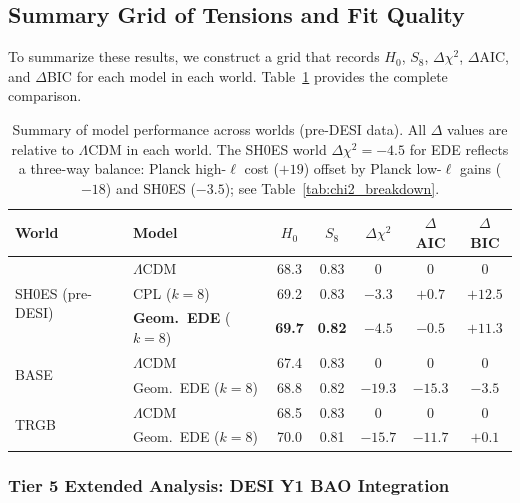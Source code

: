 \documentclass[a4paper,11pt]{article}
\begin{document}

\subsection{Summary Grid of Tensions and Fit Quality}
\label{sec:summary_grid}

To summarize these results, we construct a grid that records $H_0$, $S_8$, $\Delta\chi^2$, $\Delta$AIC, and $\Delta$BIC for each model in each world. Table~\ref{tab:summary_grid} provides the complete comparison.

\begin{table}[h]
\centering
\caption{Summary of model performance across worlds (pre-DESI data). All $\Delta$ values are relative to $\Lambda$CDM in each world. The SH0ES world $\Delta\chi^2 = -4.5$ for EDE reflects a three-way balance: Planck high-$\ell$ cost ($+19$) offset by Planck low-$\ell$ gains ($-18$) and SH0ES ($-3.5$); see Table~\ref{tab:chi2_breakdown}.}
\label{tab:summary_grid}
\begin{tabular}{llccccc}
\toprule
World & Model & $H_0$ & $S_8$ & $\Delta\chi^2$ & $\Delta$AIC & $\Delta$BIC \\
\midrule
\multirow{3}{*}{SH0ES (pre-DESI)} 
 & $\Lambda$CDM & 68.3 & 0.83 & 0 & 0 & 0 \\
 & CPL ($k=8$) & 69.2 & 0.83 & $-3.3$ & $+0.7$ & $+12.5$ \\
 & \textbf{Geom.\ EDE} ($k=8$) & \textbf{69.7} & \textbf{0.82} & $\mathbf{-4.5}$ & $\mathbf{-0.5}$ & $+11.3$ \\
\midrule
\multirow{2}{*}{BASE} 
 & $\Lambda$CDM & 67.4 & 0.83 & 0 & 0 & 0 \\
 & Geom.\ EDE ($k=8$) & 68.8 & 0.82 & $-19.3$ & $-15.3$ & $-3.5$ \\
\midrule
\multirow{2}{*}{TRGB} 
 & $\Lambda$CDM & 68.5 & 0.83 & 0 & 0 & 0 \\
 & Geom.\ EDE ($k=8$) & 70.0 & 0.81 & $-15.7$ & $-11.7$ & $+0.1$ \\
\bottomrule
\end{tabular}
\end{table}

\subsubsection{Tier 5 Extended Analysis: DESI Y1 BAO Integration}
\end{document}
